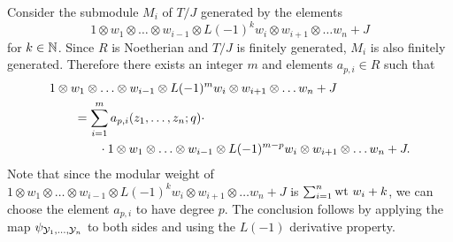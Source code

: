 \documentclass[12pt]{article}
\begin{document}
\proof
  Consider the submodule $M_i$ of $T/J$ generated by the elements
  $$
    1\otimes w_1\otimes \ldots \otimes w_{i-1}\otimes L(-1)^kw_i
      \otimes w_{i+1}\otimes \ldots w_n + J
  $$
  for $k\in \mathbb{N}$. Since $R$ is Noetherian and $T/J$ is finitely generated,
  $M_i$ is also finitely generated. Therefore there exists an integer $m$
  and elements $a_{p,i}\in R$ such that
  \begin{align}
    &1\otimes w_1\otimes \ldots \otimes w_{i-1}\otimes L(-1)^mw_i
      \otimes w_{i+1}\otimes \ldots w_n + J\nonumber \\
    &\qquad = \sum_{i=1}^m a_{p,i}(z_1,\ldots,z_n; q)\cdot\nonumber \\
    &\qquad\qquad \cdot 1\otimes w_1\otimes \ldots \otimes w_{i-1}\otimes L(-1)^{m-p}w_i
      \otimes w_{i+1}\otimes \ldots w_n + J.
  \end{align}
  Note that since the modular weight of 
  $
    1\otimes w_1\otimes \ldots \otimes w_{i-1}\otimes L(-1)^kw_i
    \otimes w_{i+1}\otimes \ldots w_n + J
  $
  is $\sum_{i=1}^n \mbox{\rm wt}\  w_i + k$, we can choose the element $a_{p,i}$ to have degree $p$.
  The conclusion follows by applying the map $\psi_{\mathcal{Y}_1,\ldots, \mathcal{Y}_n}$ to both sides
  and using the $L(-1)$ derivative property.
\epfv
\end{document}

